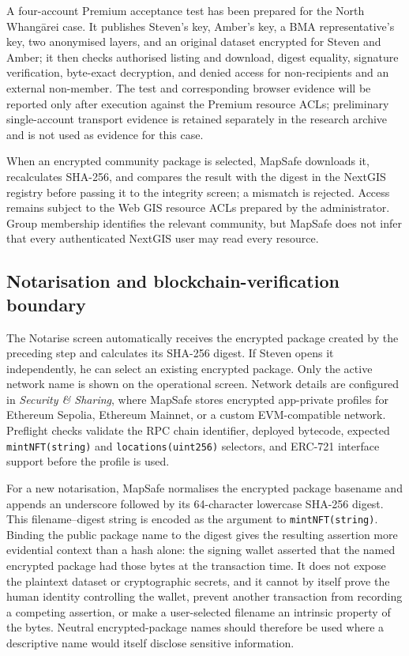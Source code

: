 \documentclass[a4paper,UKenglish,cleveref,autoref,thm-restate]{lipics-v2021}
\begin{document}
A four-account Premium acceptance test has been prepared for the North Whangārei case. It publishes Steven's key, Amber's key, a BMA representative's key, two anonymised layers, and an original dataset encrypted for Steven and Amber; it then checks authorised listing and download, digest equality, signature verification, byte-exact decryption, and denied access for non-recipients and an external non-member. The test and corresponding browser evidence will be reported only after execution against the Premium resource ACLs; preliminary single-account transport evidence is retained separately in the research archive and is not used as evidence for this case.

When an encrypted community package is selected, MapSafe downloads it, recalculates SHA-256, and compares the result with the digest in the NextGIS registry before passing it to the integrity screen; a mismatch is rejected. Access remains subject to the Web GIS resource ACLs prepared by the administrator. Group membership identifies the relevant community, but MapSafe does not infer that every authenticated NextGIS user may read every resource.

\subsection{Notarisation and blockchain-verification boundary}
\label{sec:notarisation}

The Notarise screen automatically receives the encrypted package created by the preceding step and calculates its SHA-256 digest. If Steven opens it independently, he can select an existing encrypted package. Only the active network name is shown on the operational screen. Network details are configured in \emph{Security \& Sharing}, where MapSafe stores encrypted app-private profiles for Ethereum Sepolia, Ethereum Mainnet, or a custom EVM-compatible network. Preflight checks validate the RPC chain identifier, deployed bytecode, expected \texttt{mintNFT(string)} and \texttt{locations(uint256)} selectors, and ERC-721 interface support before the profile is used.

For a new notarisation, MapSafe normalises the encrypted package basename and appends an underscore followed by its 64-character lowercase SHA-256 digest. This filename--digest string is encoded as the argument to \texttt{mintNFT(string)}. Binding the public package name to the digest gives the resulting assertion more evidential context than a hash alone: the signing wallet asserted that the named encrypted package had those bytes at the transaction time. It does not expose the plaintext dataset or cryptographic secrets, and it cannot by itself prove the human identity controlling the wallet, prevent another transaction from recording a competing assertion, or make a user-selected filename an intrinsic property of the bytes. Neutral encrypted-package names should therefore be used where a descriptive name would itself disclose sensitive information.
\end{document}
